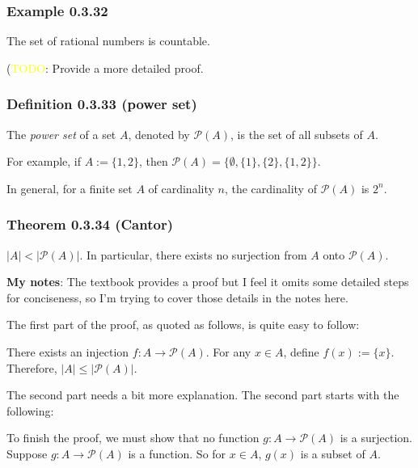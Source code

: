\documentclass[12pt, letterpaper, oneside]{book}
\begin{document}
\subsubsection{Example 0.3.32}

The set of rational numbers is countable.

(\colorbox{red!100}{\textcolor{yellow}{TODO}}: Provide a more detailed proof.

\subsubsection{Definition 0.3.33 (power set)}

The \textit{power set} of a set $A$, denoted by $\mathcal{P}(A)$, is the set of
all subsets of $A$.

For example, if $A := \{1, 2\}$, then $\mathcal{P}(A) = \{\emptyset, \{1\},
\{2\}, \{1, 2\}\}$.

In general, for a finite set $A$ of cardinality $n$, the cardinality of
$\mathcal{P}(A)$ is $2^n$.

\subsubsection{Theorem 0.3.34 (Cantor)}

$|A| < |\mathcal{P}(A)|$. In particular, there exists no surjection from $A$
onto $\mathcal{P}(A)$.

\colorbox{lime!100}{\textbf{My notes}}: The textbook provides a proof but I
feel it omits some detailed steps for conciseness, so I'm trying to cover those
details in the notes here.

The first part of the proof, as quoted as follows, is quite easy to follow:

\begin{displayquote}
  There exists an injection $f: A \rightarrow \mathcal{P}(A)$. For any $x \in
  A$, define $f(x) := \{x\}$. Therefore, $|A| \leq |\mathcal{P}(A)|$.
\end{displayquote}

The second part needs a bit more explanation. The second part starts with the
following:

\begin{displayquote}
  To finish the proof, we must show that no function $g: A \rightarrow
  \mathcal{P}(A)$ is a surjection. Suppose $g: A \rightarrow \mathcal{P}(A)$ is
  a function. So for $x \in A$, $g(x)$ is a subset of $A$.
\end{displayquote}
\end{document}
